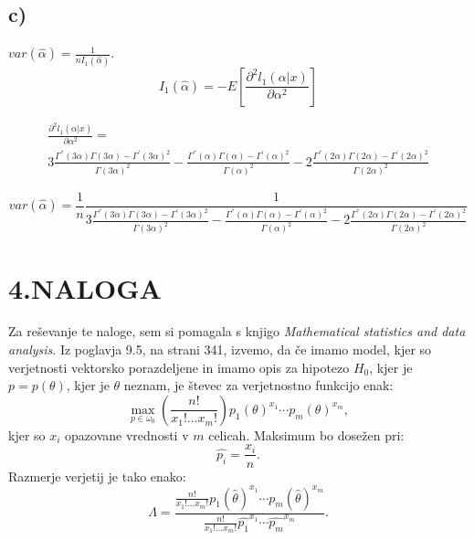 \documentclass{article}
\begin{document}
\subsection*{c)}
$var(\hat{\alpha}) = \frac{1}{nI_1(\hat{\alpha})}$.
\begin{equation*}
I_1(\hat{\alpha}) = -E\left[  \frac{\partial^2l_1(\alpha|x)}{\partial \alpha^2}   \right]
\end{equation*}

\begin{equation*}
\begin{split}
\frac{\partial^2l_1(\alpha|x)}{\partial \alpha^2} =\\  3\frac{\Gamma^{''}(3\alpha)\Gamma(3\alpha) - \Gamma^{'}(3\alpha)^2}{\Gamma(3\alpha)^2} -
\frac{\Gamma^{''}(\alpha)\Gamma(\alpha) - \Gamma^{'}(\alpha)^2}{\Gamma(\alpha)^2} -
2\frac{\Gamma^{''}(2\alpha)\Gamma(2\alpha) - \Gamma^{'}(2\alpha)^2}{\Gamma(2\alpha)^2}
\end{split}
\end{equation*}

\begin{equation*}
var(\hat{\alpha}) =\frac{1}{n} \frac{1}{ 3\frac{\Gamma^{''}(3\alpha)\Gamma(3\alpha) - \Gamma^{'}(3\alpha)^2}{\Gamma(3\alpha)^2} -
\frac{\Gamma^{''}(\alpha)\Gamma(\alpha) - \Gamma^{'}(\alpha)^2}{\Gamma(\alpha)^2} -
2\frac{\Gamma^{''}(2\alpha)\Gamma(2\alpha) - \Gamma^{'}(2\alpha)^2}{\Gamma(2\alpha)^2}}
\end{equation*}


\section*{4.NALOGA}
Za reševanje te naloge, sem si pomagala s knjigo \textit{Mathematical statistics and data analysis}. Iz poglavja 9.5, na strani 341, izvemo, da če imamo model, kjer so verjetnosti vektorsko porazdeljene in imamo opis za hipotezo $H_0$, kjer je $p = p(\theta)$, kjer je $\theta$ neznam, je števec za verjetnostno funkcijo enak:
\begin{equation*}
\max_{p\in \omega_0} \left(  \frac{n!}{x_1!...x_m!} \right) p_1(\theta)^{x_1} \cdots p_m(\theta)^{x_m},
\end{equation*}
kjer so $x_i$ opazovane vrednosti v $m$ celicah.
Maksimum bo dosežen pri:
\begin{equation*}
\hat{p_i} =  \frac{x_i}{n}.
\end{equation*}
Razmerje verjetij je tako enako:
\begin{equation*}
\Lambda= \frac{\frac{n!}{x_1!...x_m!}  p_1(\hat{\theta})^{x_1} \cdots p_m(\hat{\theta})^{x_m}}{\frac{n!}{x_1!...x_m!}  \hat{p_1}^{x_1} \cdots \hat{p_m}^{x_m}}.
\end{equation*}
\end{document}
